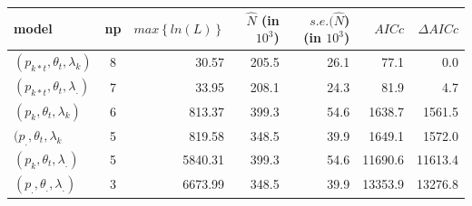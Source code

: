 \documentclass{beamer}
\begin{document}
\begin{frame}

\begin{table}
{\tiny 
\centering 
\begin{tabular}{|l|c|r|r|r|r|r|}
\hline 
model & np & $max\left\lbrace ln(L)\right\rbrace$ &$\hat{N}$ (in $ 10^{3}$)  &$s.e.(\hat{N}$) (in $ 10^{3}$) & $AICc$ \qquad  &$\Delta AICc$ \quad\\ \hline
 $( p_{k*t},\theta_{t},\lambda_{k})$ & 8    &      30.57& 205.5& 26.1&    77.1 &     0.0\\ \hline
$( p_{k*t},\theta_{t},\lambda_{.})$ & 7    &      33.95& 208.1& 24.3&    81.9 &     4.7\\ \hline
$( p_{k},\theta_{t},\lambda_{k})$ & 6    &     813.37& 399.3& 54.6&  1638.7 &  1561.5\\ \hline
 $( p_{.},\theta_{t},\lambda_{k}$ & 5    &     819.58& 348.5& 39.9&  1649.1 &  1572.0\\ \hline
 $( p_{k},\theta_{t},\lambda_{.})$ & 5    &    5840.31& 399.3& 54.6& 11690.6 & 11613.4\\ \hline
 $( p_{.},\theta_{.},\lambda_{.})$ & 3    &    6673.99& 348.5& 39.9& 13353.9 & 13276.8\\ \hline
\end{tabular}
}
\end{table}

\end{frame}
\end{document}
